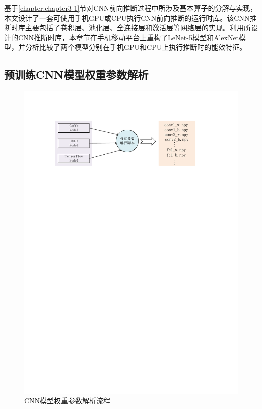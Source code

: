 基于\ref{chapter:chapter3-1}节对CNN前向推断过程中所涉及基本算子的分解与实现，本文设计了一套可使用手机GPU或CPU执行CNN前向推断的运行时库。该CNN推断时库主要包括了卷积层、池化层、全连接层和激活层等网络层的实现。利用所设计的CNN推断时库，本章节在手机移动平台上重构了LeNet-5模型和AlexNet模型，并分析比较了两个模型分别在手机GPU和CPU上执行推断时的能效特征。

\subsection{预训练CNN模型权重参数解析}
\label{chapter:chapter321}

\begin{figure}[htbp]
    \begin{center}
    \includegraphics{figures/weight.pdf}
    \end{center}
    \caption{CNN模型权重参数解析流程}\label{figure:figure14}
\end{figure}

